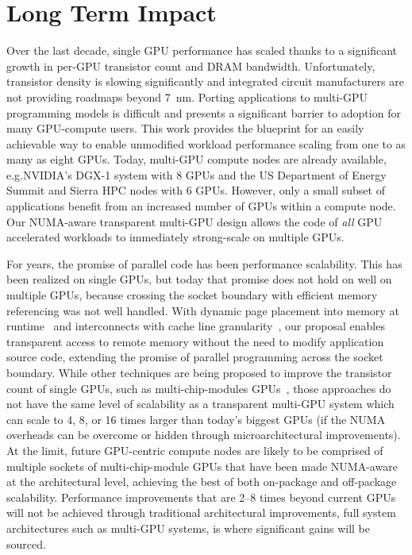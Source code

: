 \documentclass{sig-alternate}
\begin{document}
\vspace{-.05in}
\section{Long Term Impact} Over the last decade, single GPU performance has 
scaled thanks to a significant growth in per-GPU transistor count and DRAM 
bandwidth. Unfortunately, transistor density is slowing significantly and 
integrated circuit manufacturers are not providing roadmaps beyond \SI{7}{nm}.
Porting applications to multi-GPU programming models is difficult and presents
a significant barrier to adoption for many GPU-compute users. This work provides
the blueprint for an easily achievable way to enable unmodified workload performance
scaling from one to as many as eight GPUs.
Today, multi-GPU compute nodes are already available, e.g.\@ NVIDIA's DGX-1 
system with 8 GPUs and the US Department of Energy Summit and Sierra HPC 
nodes with 6 GPUs. However, only a small subset of applications benefit from an increased number of GPUs 
within a compute
node. Our NUMA-aware transparent multi-GPU design allows the code of \textit{all} GPU accelerated 
workloads to immediately strong-scale on multiple GPUs.\@

For years, the promise of parallel code has been performance scalability. 
This has been realized on single GPUs, but today that promise does not hold on 
well on multiple GPUs, because crossing the socket boundary with efficient memory referencing 
was not well handled. With dynamic page placement into memory at 
runtime~\cite{UVM} and interconnects with cache line granularity~\cite{NVLINK}, 
our proposal enables transparent access to remote memory without the need to 
modify application source code, extending the promise of parallel programming across
the socket boundary.  While other techniques are being proposed to improve the transistor
count of single GPUs, such as multi-chip-modules GPUs~\cite{Arunkumar2017}, those
approaches do not have the same level of scalability as a transparent multi-GPU
system which can scale to 4, 8, or 16 times larger than today's biggest GPUs (if
the NUMA overheads can be overcome or hidden through microarchitectural improvements).
At the limit, future GPU-centric compute nodes are likely to be comprised of multiple sockets
of multi-chip-module GPUs that have been made NUMA-aware at the architectural level, achieving
the best of both on-package and off-package scalability. Performance
improvements that are 2--8 times beyond current GPUs will not be achieved through traditional
architectural improvements, full system architectures such as multi-GPU systems, is 
where significant gains will be sourced.
\end{document}
